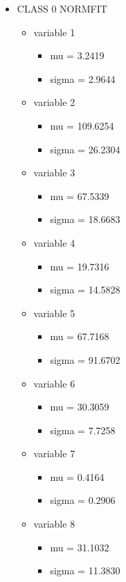 \documentclass[a4paper]{article}
\begin{document}
\begin{itemize}
    \item CLASS 0 NORMFIT
    \begin{itemize}
        \item variable 1
        \begin{itemize}
            \item mu = 3.2419
            \item sigma = 2.9644
        \end{itemize}
        \item variable 2
        \begin{itemize}
            \item mu = 109.6254
            \item sigma = 26.2304
        \end{itemize}
        \item variable 3
        \begin{itemize}
            \item mu = 67.5339
            \item sigma = 18.6683
        \end{itemize}
        \item variable 4
        \begin{itemize}
            \item mu = 19.7316
            \item sigma = 14.5828
        \end{itemize}
        \item variable 5
        \begin{itemize}
            \item mu = 67.7168
            \item sigma = 91.6702
        \end{itemize}
        \item variable 6
        \begin{itemize}
            \item mu = 30.3059
            \item sigma = 7.7258
        \end{itemize}
        \item variable 7
        \begin{itemize}
            \item mu = 0.4164
            \item sigma = 0.2906
        \end{itemize}
        \item variable 8
        \begin{itemize}
            \item mu = 31.1032
            \item sigma = 11.3830
        \end{itemize}
    \end{itemize}
    

\end{itemize}
\end{document}
